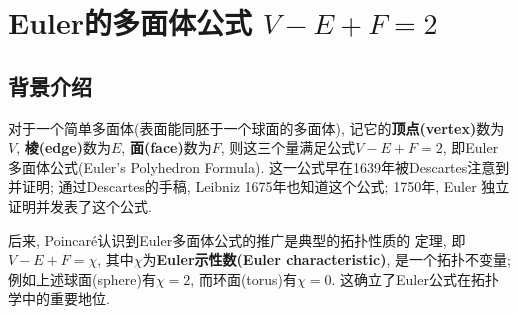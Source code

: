 \documentclass[main]{subfiles}
\begin{document}
\renewcommand{\filename}{subfile7}%
{} 
\section{Euler的多面体公式 $V-E+F=2$}
\subsection*{背景介绍}
对于一个简单多面体(表面能同胚于一个球面的多面体), 记它的\textbf{顶点(vertex)}数为$V$, \textbf{棱(edge)}数为$E$, 
\textbf{面(face)}数为$F$, 则这三个量满足公式$V-E+F=2$, 即Euler多面体公式(Euler's Polyhedron Formula). 这一公式早在1639年被Descartes注意到并证明;
通过Descartes的手稿, Leibniz 1675年也知道这个公式; 1750年, Euler 独立证明并发表了这个公式.


后来, Poincaré认识到Euler多面体公式的推广是典型的拓扑性质的
定理, 即$V-E+F=\chi$, 其中$\chi$为\textbf{Euler示性数(Euler characteristic)}, 是一个拓扑不变量; 例如上述球面(sphere)有$\chi=2$, 而环面(torus)有$\chi=0$.
这确立了Euler公式在拓扑学中的重要地位. 
\end{document}
